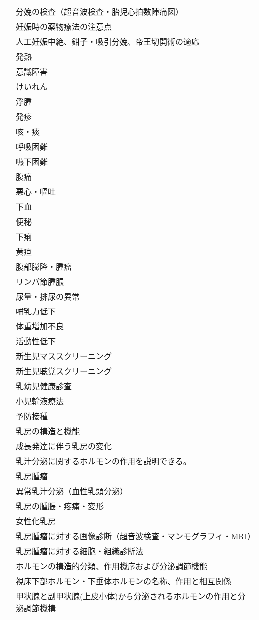 \begin{xltabular}{\linewidth}{XX}
 & 分娩の検査（超音波検査・胎児心拍数陣痛図） \\
 & 妊娠時の薬物療法の注意点 \\
 & 人工妊娠中絶、鉗子・吸引分娩、帝王切開術の適応 \\
 & 発熱 \\
 & 意識障害 \\
 & けいれん \\
 & 浮腫 \\
 & 発疹 \\
 & 咳・痰 \\
 & 呼吸困難 \\
 & 嚥下困難 \\
 & 腹痛 \\
 & 悪心・嘔吐 \\
 & 下血 \\
 & 便秘 \\
 & 下痢 \\
 & 黄疸 \\
 & 腹部膨隆・腫瘤 \\
 & リンパ節腫脹 \\
 & 尿量・排尿の異常 \\
 & 哺乳力低下 \\
 & 体重増加不良 \\
 & 活動性低下 \\
 & 新生児マススクリーニング \\
 & 新生児聴覚スクリーニング \\
 & 乳幼児健康診査 \\
 & 小児輸液療法 \\
 & 予防接種 \\
 & 乳房の構造と機能 \\
 & 成長発達に伴う乳房の変化 \\
 & 乳汁分泌に関するホルモンの作用を説明できる。 \\
 & 乳房腫瘤 \\
 & 異常乳汁分泌（血性乳頭分泌） \\
 & 乳房の腫脹・疼痛・変形 \\
 & 女性化乳房 \\
 & 乳房腫瘤に対する画像診断（超音波検査・マンモグラフィ・MRI） \\
 & 乳房腫瘤に対する細胞・組織診断法 \\
 & ホルモンの構造的分類、作用機序および分泌調節機能 \\
 & 視床下部ホルモン・下垂体ホルモンの名称、作用と相互関係 \\
 & 甲状腺と副甲状腺(上皮小体)から分泌されるホルモンの作用と分泌調節機構 \\

\end{xltabular}
